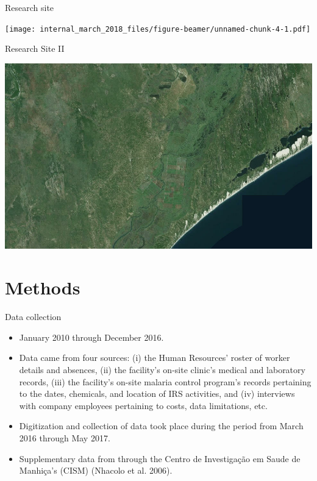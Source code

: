 \documentclass[ignorenonframetext,]{beamer}
\providecommand{\tightlist}{%
  \setlength{\itemsep}{0pt}\setlength{\parskip}{0pt}}
\begin{document}
\begin{frame}{Research site}

\texttt{[image: internal\_march\_2018\_files/figure-beamer/unnamed-chunk-4-1.pdf]}

\end{frame}

\begin{frame}{Research Site II}

\includegraphics{images/sat}

\end{frame}

\section{Methods}\label{methods}

\begin{frame}{Data collection}

\begin{itemize}
\tightlist
\item
  January 2010 through December 2016.\\
\item
  Data came from four sources: (i) the Human Resources' roster of worker
  details and absences, (ii) the facility's on-site clinic's medical and
  laboratory records, (iii) the facility's on-site malaria control
  program's records pertaining to the dates, chemicals, and location of
  IRS activities, and (iv) interviews with company employees pertaining
  to costs, data limitations, etc.\\
\item
  Digitization and collection of data took place during the period from
  March 2016 through May 2017.
\item
  Supplementary data from through the Centro de Investigação em Saude de
  Manhiça's (CISM) (Nhacolo et al. 2006).
\end{itemize}

\end{frame}
\end{document}
